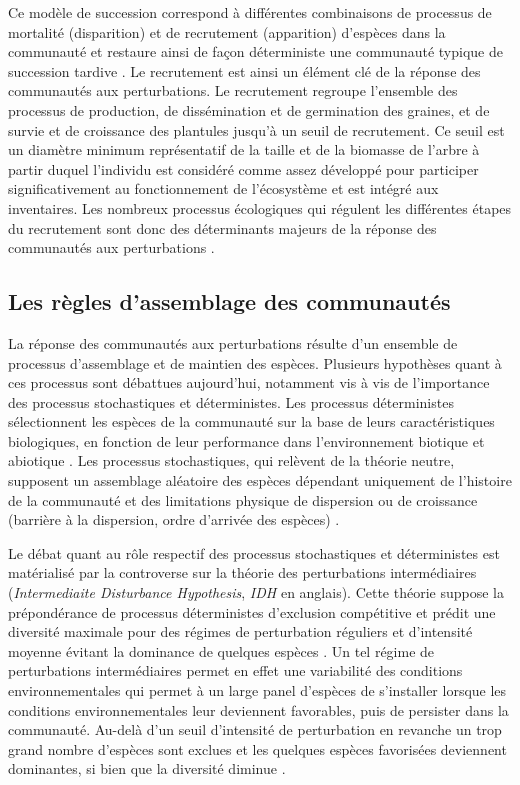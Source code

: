 \documentclass[
  11pt,
  french,
  A4paper,
  extrafontsizes,onecolumn,openright
  ]{memoir}
\begin{document}
Ce modèle de succession correspond à différentes combinaisons de
processus de mortalité (disparition) et de recrutement (apparition)
d'espèces dans la communauté et restaure ainsi de façon déterministe une
communauté typique de succession tardive \autocite{Denslow2000}. Le
recrutement est ainsi un élément clé de la réponse des communautés aux
perturbations. Le recrutement regroupe l'ensemble des processus de
production, de dissémination et de germination des graines, et de survie
et de croissance des plantules jusqu'à un seuil de recrutement. Ce seuil
est un diamètre minimum représentatif de la taille et de la biomasse de
l'arbre à partir duquel l'individu est considéré comme assez développé
pour participer significativement au fonctionnement de l'écosystème et
est intégré aux inventaires. Les nombreux processus écologiques qui
régulent les différentes étapes du recrutement sont donc des
déterminants majeurs de la réponse des communautés aux perturbations
\autocites{Denslow1980}{Schnitzer2001}{Asner2004}.

\subsection{Les règles d'assemblage des
communautés}\label{les-regles-dassemblage-des-communautes}

La réponse des communautés aux perturbations résulte d'un ensemble de
processus d'assemblage et de maintien des espèces. Plusieurs hypothèses
quant à ces processus sont débattues aujourd'hui, notamment vis à vis de
l'importance des processus stochastiques et déterministes. Les processus
déterministes sélectionnent les espèces de la communauté sur la base de
leurs caractéristiques biologiques, en fonction de leur performance dans
l'environnement biotique et abiotique \autocite{Molino2001}. Les
processus stochastiques, qui relèvent de la théorie neutre, supposent un
assemblage aléatoire des espèces dépendant uniquement de l'histoire de
la communauté et des limitations physique de dispersion ou de croissance
(barrière à la dispersion, ordre d'arrivée des espèces)
\autocite{Hubbell2001}.

Le débat quant au rôle respectif des processus stochastiques et
déterministes est matérialisé par la controverse sur la théorie des
perturbations intermédiaires (\emph{Intermediaite Disturbance
Hypothesis}, \emph{IDH} en anglais). Cette théorie suppose la
prépondérance de processus déterministes d'exclusion compétitive et
prédit une diversité maximale pour des régimes de perturbation réguliers
et d'intensité moyenne évitant la dominance de quelques espèces
\autocite{Molino2001}. Un tel régime de perturbations intermédiaires
permet en effet une variabilité des conditions environnementales qui
permet à un large panel d'espèces de s'installer lorsque les conditions
environnementales leur deviennent favorables, puis de persister dans la
communauté. Au-delà d'un seuil d'intensité de perturbation en revanche
un trop grand nombre d'espèces sont exclues et les quelques espèces
favorisées deviennent dominantes, si bien que la diversité diminue
\autocites{Chesson2000}{Kariuki2006a}{Berry2008a}.
\end{document}
